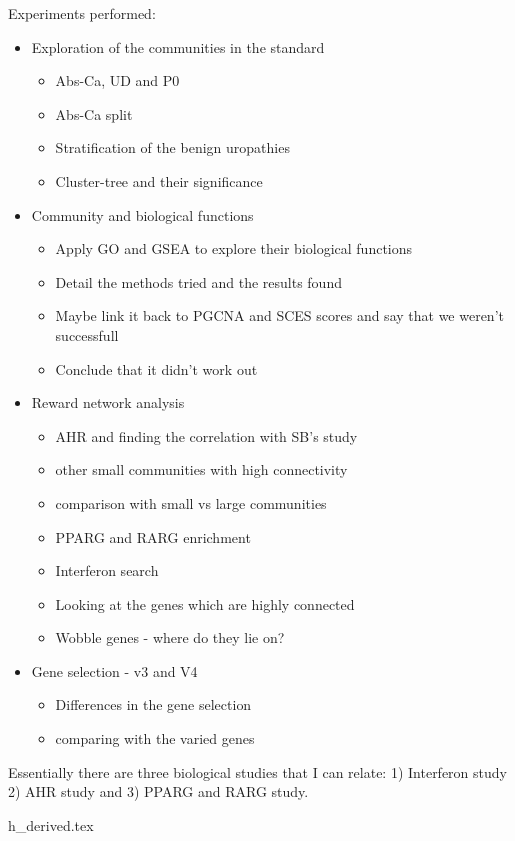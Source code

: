 Experiments performed:
\begin{itemize}
    \item Exploration of the communities in the standard
    \begin{itemize}
        \item Abs-Ca, UD and P0
        \item Abs-Ca split
        \item Stratification of the benign uropathies 
        \item Cluster-tree and their significance
    \end{itemize}
    \item Community and biological functions 
    \begin{itemize}
        \item Apply GO and GSEA to explore their biological functions
        \item Detail the methods tried and the results found
        \item Maybe link it back to PGCNA and SCES scores and say that we weren't successfull
        \item Conclude that it didn't work out
    \end{itemize}
    \item Reward network analysis
    \begin{itemize}
        \item AHR and finding the correlation with SB's study
        \item other small communities with high connectivity
        \item comparison with small vs large communities
        \item PPARG and RARG enrichment
        \item Interferon search
        \item Looking at the genes which are highly connected
        \item Wobble genes - where do they lie on?
    \end{itemize}
    \item Gene selection - v3 and V4
    \begin{itemize}
        \item Differences in the gene selection
        \item comparing with the varied genes
    \end{itemize}
\end{itemize}

Essentially there are three biological studies that I can relate: 1) Interferon study 2) AHR study and 3) PPARG and RARG study.

{h_derived.tex}

\newpage
